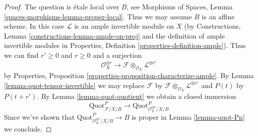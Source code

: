\documentclass[10pt,a4paper]{amsart}
\theoremstyle{plain}
\theoremstyle{definition}
\theoremstyle{remark}
\numberwithin{equation}{subsection}
\def\Quotfunctor{\mathrm{Quot}}
\begin{document}
\begin{proof}
The question is \'etale local over $B$, see
Morphisms of Spaces, Lemma \ref{spaces-morphisms-lemma-proper-local}.
Thus we may assume $B$ is an affine scheme.
In this case $\mathcal{L}$ is an ample invertible module on $X$
(by Constructions, Lemma \ref{constructions-lemma-ample-on-proj}
and the definition of ample invertible modules in
Properties, Definition \ref{properties-definition-ample}).
Thus we can find $r' \geq 0$ and $r \geq 0$ and a surjection
$$
\mathcal{O}_X^{\oplus r} \longrightarrow
\mathcal{F} \otimes_{\mathcal{O}_X} \mathcal{L}^{\otimes r'}
$$
by Properties, Proposition \ref{properties-proposition-characterize-ample}.
By Lemma \ref{lemma-quot-tensor-invertible}
we may replace $\mathcal{F}$ by
$\mathcal{F} \otimes_{\mathcal{O}_X} \mathcal{L}^{\otimes r'}$
and $P(t)$ by $P(t + r')$.
By Lemma \ref{lemma-quot-quotient}
we obtain a closed immersion
$$
\Quotfunctor^P_{\mathcal{F}/X/B}
\longrightarrow
\Quotfunctor^P_{\mathcal{O}_X^{\oplus r}/X/B}
$$
Since we've shown that $\Quotfunctor^P_{\mathcal{O}_X^{\oplus r}/X/B} \to B$
is proper in Lemma \ref{lemma-quot-Pn} we conclude.
\end{proof}
\end{document}
